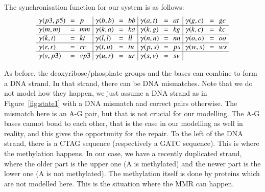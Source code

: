 The synchronisation function for our system is as follows:
%
\[\arraycolsep=3.4pt\def\arraystretch{1.0}
\begin{array}{ l c l | l c l | l c l | l c l}
\gamma(p3,p5) & = & p & \gamma(b,b) & = & bb & \gamma(a,t) & = & at &  \gamma(g,c) & = & gc \\
\hline
\gamma(m,m) & = & mm & \gamma(k,a) & = & ka & \gamma(k, g) & = & kg & \gamma(k,c) & = & kc \\
\hline
\gamma(k,t) & = & kt & \gamma(l,l) & = & ll &\gamma(n,n) & = & nn & \gamma(o,o) & = & oo\\
\hline
\gamma(r,r) & = & rr & \gamma(t,u) & = & tu &\gamma(p,s) & = & ps &\gamma(w,s) & = & ws\\
\hline
\gamma(v,p3) & = & vp3 &  \gamma(u,r) & = & ur  & \gamma(s,v) & = & sv & & & \\
\end{array}
\]

As before, the deoxyribose/phosphate groups and the bases can combine to form a DNA strand. In that strand, there can be DNA mismatches. Note that we do not model how they happen, we just assume a DNA strand as in Figure~\ref{fig:state1} with a DNA mismatch and correct pairs otherwise. The mismatch here is an A-G pair, but that is not crucial for our modelling. The A-G bases cannot bond to each other, that is the case in our modelling as well in reality, and this gives the opportunity for the repair. To the left of the DNA strand, there is a CTAG sequence (respectively a GATC sequence). This is where the methylation happens. In our case, we have a recently duplicated strand, where the older part is the upper one (A is methylated) and the newer part is the lower one (A is not methylated). The methylation itself is done by proteins which are not modelled here. This is the situation where the MMR can happen.

